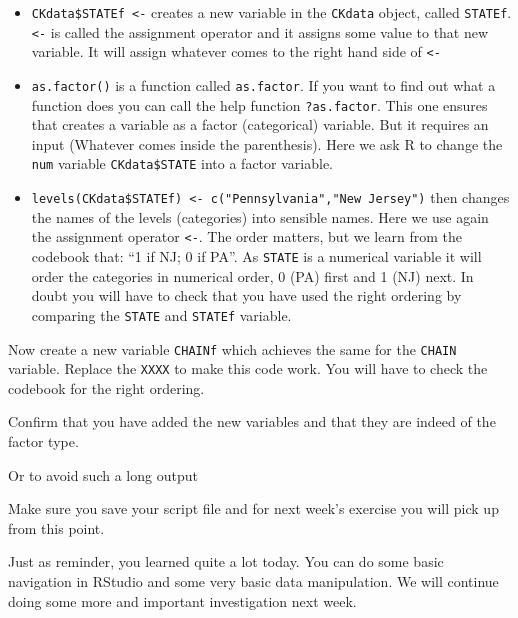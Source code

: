 \documentclass[
]{article}
\newenvironment{Shaded}{\begin{snugshade}}{\end{snugshade}}
\newcommand{\FunctionTok}[1]{\textcolor[rgb]{0.13,0.29,0.53}{\textbf{#1}}}
\newcommand{\NormalTok}[1]{#1}
\newcommand{\OtherTok}[1]{\textcolor[rgb]{0.56,0.35,0.01}{#1}}
\newcommand{\SpecialCharTok}[1]{\textcolor[rgb]{0.81,0.36,0.00}{\textbf{#1}}}
\newcommand{\StringTok}[1]{\textcolor[rgb]{0.31,0.60,0.02}{#1}}
\providecommand{\tightlist}{%
  \setlength{\itemsep}{0pt}\setlength{\parskip}{0pt}}
\begin{document}
\begin{itemize}
\tightlist
\item
  \texttt{CKdata\$STATEf\ \textless{}-} creates a new variable in the
  \texttt{CKdata} object, called \texttt{STATEf}. \texttt{\textless{}-}
  is called the assignment operator and it assigns some value to that
  new variable. It will assign whatever comes to the right hand side of
  \texttt{\textless{}-}
\item
  \texttt{as.factor()} is a function called \texttt{as.factor}. If you
  want to find out what a function does you can call the help function
  \texttt{?as.factor}. This one ensures that creates a variable as a
  factor (categorical) variable. But it requires an input (Whatever
  comes inside the parenthesis). Here we ask R to change the
  \texttt{num} variable \texttt{CKdata\$STATE} into a factor variable.
\item
  \texttt{levels(CKdata\$STATEf)\ \textless{}-\ c("Pennsylvania","New\ Jersey")}
  then changes the names of the levels (categories) into sensible names.
  Here we use again the assignment operator \texttt{\textless{}-}. The
  order matters, but we learn from the codebook that: ``1 if NJ; 0 if
  PA''. As \texttt{STATE} is a numerical variable it will order the
  categories in numerical order, 0 (PA) first and 1 (NJ) next. In doubt
  you will have to check that you have used the right ordering by
  comparing the \texttt{STATE} and \texttt{STATEf} variable.
\end{itemize}

Now create a new variable \texttt{CHAINf} which achieves the same for
the \texttt{CHAIN} variable. Replace the \texttt{XXXX} to make this code
work. You will have to check the codebook for the right ordering.

\begin{Shaded}
\end{Shaded}

Confirm that you have added the new variables and that they are indeed
of the factor type.

Or to avoid such a long output

Make sure you save your script file and for next week's exercise you
will pick up from this point.

Just as reminder, you learned quite a lot today. You can do some basic
navigation in RStudio and some very basic data manipulation. We will
continue doing some more and important investigation next week.
\end{document}
